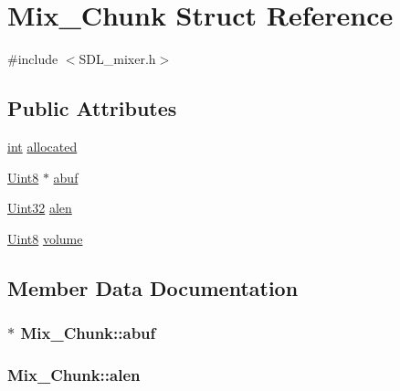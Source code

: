\hypertarget{struct_mix___chunk}{}\section{Mix\+\_\+\+Chunk Struct Reference}
\label{struct_mix___chunk}


{\ttfamily \#include $<$S\+D\+L\+\_\+mixer.\+h$>$}

\subsection*{Public Attributes}
\begin{DoxyCompactItemize}
\item 
\hyperlink{_s_d_l__thread_8h_a6a64f9be4433e4de6e2f2f548cf3c08e}{int} \hyperlink{struct_mix___chunk_a7b985b90b5f97fffe34834116a281615}{allocated}
\item 
\hyperlink{_s_d_l__stdinc_8h_a2944638813a090aa23e62f4da842c3e2}{Uint8} $\ast$ \hyperlink{struct_mix___chunk_a30b3b1a72677d076a1caa72422bb3774}{abuf}
\item 
\hyperlink{_s_d_l__stdinc_8h_add440eff171ea5f55cb00c4a9ab8672d}{Uint32} \hyperlink{struct_mix___chunk_a958507964471fc4b9fa0d215f1852d05}{alen}
\item 
\hyperlink{_s_d_l__stdinc_8h_a2944638813a090aa23e62f4da842c3e2}{Uint8} \hyperlink{struct_mix___chunk_afc566fd5da7f0ed1f3577f5bc0eac319}{volume}
\end{DoxyCompactItemize}


\subsection{Member Data Documentation}
\subsubsection[{\texorpdfstring{abuf}{abuf}}]{$\ast$ Mix\+\_\+\+Chunk\+::abuf}\hypertarget{struct_mix___chunk_a30b3b1a72677d076a1caa72422bb3774}{}\label{struct_mix___chunk_a30b3b1a72677d076a1caa72422bb3774}
\subsubsection[{\texorpdfstring{alen}{alen}}]{ Mix\+\_\+\+Chunk\+::alen}\hypertarget{struct_mix___chunk_a958507964471fc4b9fa0d215f1852d05}{}\label{struct_mix___chunk_a958507964471fc4b9fa0d215f1852d05}
